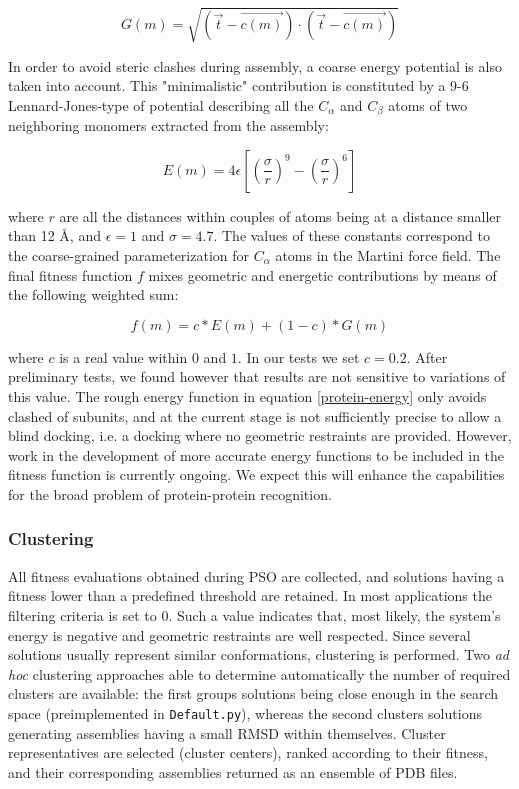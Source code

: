 \documentclass[a4paper, 12pt]{article}
\begin{document}
\begin{equation}
G(m)= \sqrt{(\vec{t}-\vec{c(m)})\cdot(\vec{t}-\vec{c(m)})}
\end{equation}

In order to avoid steric clashes during assembly, a coarse energy potential is also taken into account. This "minimalistic" contribution is constituted by a 9-6 Lennard-Jones-type of potential describing all the $C_\alpha$ and $C_\beta$ atoms of two neighboring monomers extracted from the assembly:

\begin{equation}
\label{protein-energy}
E(m)= 4\epsilon \left[ \left(\frac{\sigma}{r}\right)^9 - \left(\frac{\sigma}{r}\right)^6 \right]
\end{equation}

where $r$ are all the distances within couples of atoms being at a distance smaller than 12 \AA, and $\epsilon=1$ and $\sigma=4.7$. The values of these constants correspond to the coarse-grained parameterization for $C_\alpha$ atoms in the Martini force field. The final fitness function $f$ mixes geometric and energetic contributions by means of the following weighted sum:

\begin{equation}
\label{protein-fitness}
f(m)=c*E(m)+(1-c)*G(m)
\end{equation}

where $c$ is a real value within $0$ and $1$. In our tests we set $c=0.2$. After preliminary tests, we found however that results are not sensitive to variations of this value. The rough energy function in equation \ref{protein-energy}  only avoids clashed of subunits, and at the current stage is not sufficiently precise to allow a blind docking, i.e. a docking where no geometric restraints are provided. However, work in the development of more accurate energy functions to be included in the fitness function is currently ongoing. We expect this will enhance the capabilities  for the broad problem of protein-protein recognition.

\subsubsection{Clustering}

All fitness evaluations obtained during PSO are collected, and solutions having a fitness lower than a predefined threshold are retained. In most applications the filtering criteria is set to 0. Such a value indicates that, most likely, the system's energy is negative and geometric restraints are well respected. Since several solutions usually represent similar conformations, clustering is performed. Two \emph{ad hoc} clustering approaches able to determine automatically the number of required clusters are available: the first groups solutions being close enough in the search space (preimplemented in \texttt{Default.py}), whereas the second clusters solutions generating assemblies having a small RMSD within themselves. Cluster representatives are selected (cluster centers), ranked according to their fitness, and their corresponding assemblies returned as an ensemble of PDB files.
\end{document}
